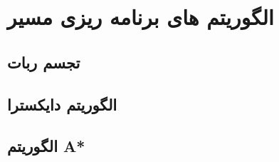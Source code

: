 \section{الگوریتم های برنامه ریزی مسیر}
\subsection{تجسم ربات}
\subsection{الگوریتم دایکسترا}
\subsection{الگوریتم A*}
